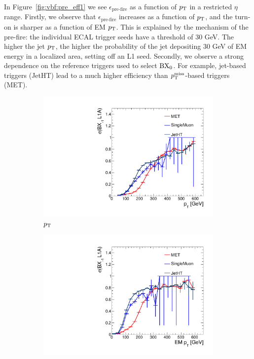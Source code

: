In Figure~\ref{fig:vbf:pre_eff1} we see $\epsilon_\text{pre-fire}$ as a function of $p_\mathrm{T}$ in a restricted $\eta$ range.
Firstly, we observe that $\epsilon_\text{pre-fire}$ increases as a function of $p_\mathrm{T}$, and the turn-on is sharper as a function of EM $p_\mathrm{T}$. 
This is explained by the mechanism of the pre-fire: the individual ECAL trigger seeds have a threshold of 30 GeV.
The higher the jet $p_\mathrm{T}$, the higher the probability of the jet depositing $30$ GeV of EM energy in a localized area, setting off an L1 seed. 
Secondly, we observe a strong dependence on the reference triggers used to select ${\mathrm{BX}_{0}}$.
For example, jet-based triggers (JetHT) lead to a much higher efficiency than $p_\mathrm{T}^\mathrm{miss}$-based triggers (MET).  

\begin{figure}[]
    \begin{center}
        \begin{subfigure}[t]{0.49\textwidth}
            \includegraphics[width=\textwidth]{figures/vbf/triggers/oned_jotPt_finor_ratio.pdf}
            \caption{$p_\mathrm{T}$}
            \label{fig:vbf:hlta}
        \end{subfigure}
        \begin{subfigure}[t]{0.49\textwidth}
            \includegraphics[width=\textwidth]{figures/vbf/triggers/oned_jotEMPt_finor_ratio.pdf}

\end{subfigure}
\end{center}
\end{figure}
